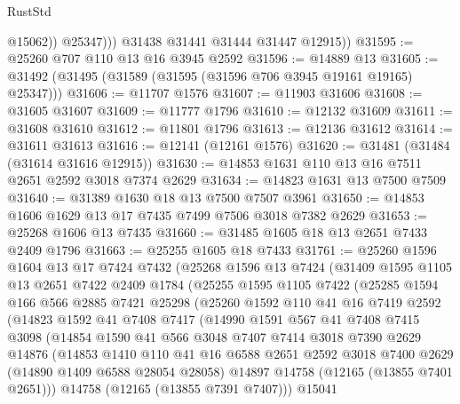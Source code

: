 \begin{lexlean}{RustStd}
\begin{coremodule}
                  @15062))
              @25347)))
        @31438
        @31441
        @31444
        @31447
        @12915))
@31595 := @25260 @707 @110 @13 @16 @3945 @2592
@31596 := @14889 @13
@31605 := @31492 (@31495 (@31589 (@31595 (@31596 @706 @3945 @19161 @19165) @25347)))
@31606 := @11707 @1576
@31607 := @11903 @31606
@31608 := @31605 @31607
@31609 := @11777 @1796
@31610 := @12132 @31609
@31611 := @31608 @31610
@31612 := @11801 @1796
@31613 := @12136 @31612
@31614 := @31611 @31613
@31616 := @12141 (@12161 @1576)
@31620 := @31481 (@31484 (@31614 @31616 @12915))
@31630 := @14853 @1631 @110 @13 @16 @7511 @2651 @2592 @3018 @7374 @2629
@31634 := @14823 @1631 @13 @7500 @7509
@31640 := @31389 @1630 @18 @13 @7500 @7507 @3961
@31650 := @14853 @1606 @1629 @13 @17 @7435 @7499 @7506 @3018 @7382 @2629
@31653 := @25268 @1606 @13 @7435
@31660 := @31485 @1605 @18 @13 @2651 @7433 @2409 @1796
@31663 := @25255 @1605 @18 @7433
@31761 := @25260
    @1596
    @1604
    @13
    @17
    @7424
    @7432
    (@25268
      @1596
      @13
      @7424
      (@31409
        @1595
        @1105
        @13
        @2651
        @7422
        @2409
        @1784
        (@25255
          @1595
          @1105
          @7422
          (@25285
            @1594
            @166
            @566
            @2885
            @7421
            @25298
            (@25260
              @1592
              @110
              @41
              @16
              @7419
              @2592
              (@14823
                @1592
                @41
                @7408
                @7417
                (@14990
                  @1591
                  @567
                  @41
                  @7408
                  @7415
                  @3098
                  (@14854
                    @1590
                    @41
                    @566
                    @3048
                    @7407
                    @7414
                    @3018
                    @7390
                    @2629
                    @14876
                    (@14853
                      @1410
                      @110
                      @41
                      @16
                      @6588
                      @2651
                      @2592
                      @3018
                      @7400
                      @2629
                      (@14890 @1409 @6588 @28054 @28058)
                      @14897
                      @14758
                      (@12165 (@13855 @7401 @2651)))
                    @14758
                    (@12165 (@13855 @7391 @7407)))
                  @15041

\end{coremodule}
\end{lexlean}
